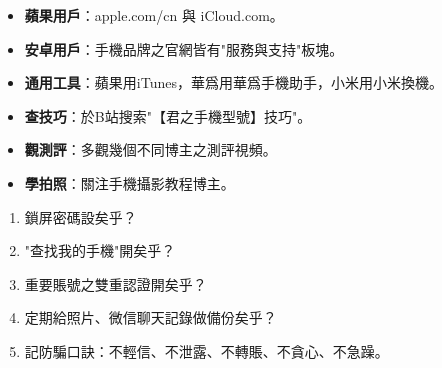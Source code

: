 

\begin{itemize}
  \item \textbf{蘋果用戶}：apple.com/cn 與 iCloud.com。
  \item \textbf{安卓用戶}：手機品牌之官網皆有"服務與支持"板塊。
  \item \textbf{通用工具}：蘋果用iTunes，華爲用華爲手機助手，小米用小米換機。
\end{itemize}


\begin{itemize}
  \item \textbf{查技巧}：於B站搜索"【君之手機型號】技巧"。
  \item \textbf{觀測評}：多觀幾個不同博主之測評視頻。
  \item \textbf{學拍照}：關注手機攝影教程博主。
\end{itemize}


\begin{enumerate}
  \item 鎖屏密碼設矣乎？
  \item "查找我的手機"開矣乎？
  \item 重要賬號之雙重認證開矣乎？
  \item 定期給照片、微信聊天記錄做備份矣乎？
  \item 記防騙口訣：不輕信、不泄露、不轉賬、不貪心、不急躁。
\end{enumerate}
